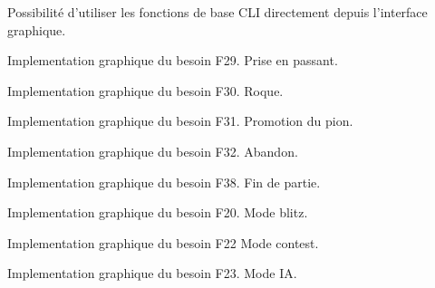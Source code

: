 \documentclass{article}
\begin{document}
\begin{needbox}
    Possibilité d'utiliser les fonctions de base CLI directement depuis l'interface graphique.
    \begin{subneedbox}
        Implementation graphique du besoin F29. Prise en passant.
    \end{subneedbox}
    \begin{subneedbox}[F46.2: Roque]
        Implementation graphique du besoin F30. Roque.
    \end{subneedbox}
    \begin{subneedbox}[F46.3: Promotion]
        Implementation graphique du besoin F31. Promotion du pion.
    \end{subneedbox}
    \begin{subneedbox}[F46.4: Abandon]
        Implementation graphique du besoin F32. Abandon.
    \end{subneedbox}
    \begin{subneedbox}
        Implementation graphique du besoin F38. Fin de partie.
    \end{subneedbox}
    \begin{subneedbox}
        Implementation graphique du besoin F20. Mode blitz.
    \end{subneedbox}
    \begin{subneedbox}
        Implementation graphique du besoin F22 Mode contest.
    \end{subneedbox}
    \begin{subneedbox}[F46.8: Mode IA]
        Implementation graphique du besoin F23. Mode IA.
    \end{subneedbox}
    
\end{needbox}
\end{document}

